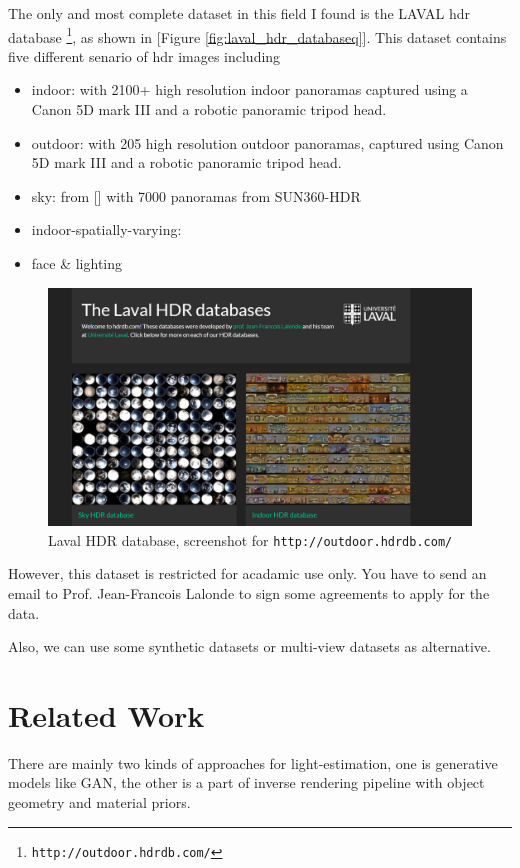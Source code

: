 \documentclass{article}
\begin{document}
The only and most complete dataset in this field I found is the
LAVAL hdr database \footnote{\texttt{http://outdoor.hdrdb.com/}}, as shown in [Figure \ref{fig:laval_hdr_databaseq}].
This dataset contains five different senario of hdr images including
\begin{itemize}
    \item indoor: with 2100+ high resolution indoor panoramas captured using a Canon 5D mark III and a robotic panoramic tripod head.
    \item outdoor: with 205 high resolution outdoor panoramas, captured using Canon 5D mark III and a robotic panoramic tripod head.
    \item sky: from [\cite{hold-geoffroyDeepSkyModeling2019}] with 7000 panoramas from SUN360-HDR
    \item indoor-spatially-varying:
    \item face \& lighting
\end{itemize}

\begin{figure}
    \centering
    \includegraphics[width=0.8\linewidth]{laval_hdr_database.png}
    \caption{Laval HDR database, screenshot for \texttt{http://outdoor.hdrdb.com/}}
    \label{fig:laval_hdr_database}
\end{figure}

However, this dataset is restricted for acadamic use only. You have to send an email to
Prof. Jean-Francois Lalonde to sign some agreements to apply for the data.

Also, we can use some synthetic datasets or multi-view datasets as alternative.

\section{Related Work}
\label{sec:related-work}

There are mainly two kinds of approaches for light-estimation,
one is generative models like GAN, the other is a part of inverse rendering pipeline with
object geometry and material priors.
\end{document}
